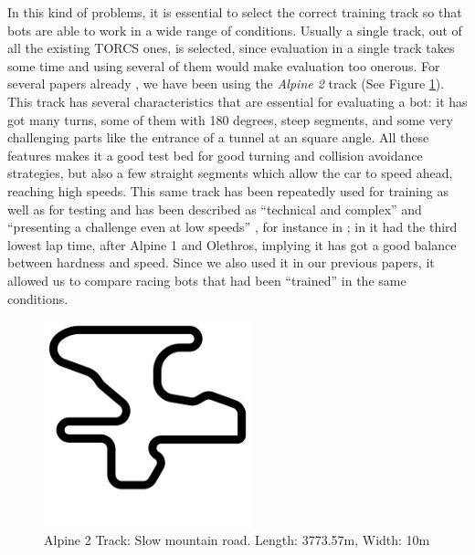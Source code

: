 \documentclass[10pt,journal,compsoc]{IEEEtran}
\begin{document}

In this kind of problems, it is essential to select the correct
training track so that bots are able to work in a wide range of
conditions. Usually a single track, out of all the existing TORCS
ones, is selected, since evaluation in a single track takes some time
and using several of them would make evaluation too onerous. For
several papers already \cite{salem_cig2018,DBLP:conf/cig/SalemMG19},
we have been using the \textit{Alpine 2} track (See Figure
\ref{fig:alpine2_track}). This track has several characteristics that
are essential for evaluating a bot: it has got many turns, some of
them with 180 degrees, steep segments, and some very challenging parts
like the entrance of a tunnel at an square angle. All these features makes
it a good test bed for good turning and collision avoidance
strategies, but also a few straight segments which allow the car to
speed ahead, reaching high speeds. This same track has been repeatedly
used for training as well as for testing and has been described as
``technical and complex'' \cite{AG} and ``presenting a challenge even
at low speeds'' \cite{vrajitoru2018global}, for instance in
\cite{cardamone2010applying,CarRacing_Pelta09,zong2017obstacle}; in \cite{AG} it had
the third lowest lap time, after Alpine 1 and Olethros, implying it
has got a good balance between hardness and speed. Since we also used
it in our previous papers, it allowed us to compare racing bots that
had been ``trained'' in the same conditions.

\begin{figure}[!ht]	
	\begin{center}
		\includegraphics[width=6cm]{fig/alpine2.jpg}
		\caption{Alpine 2 Track: Slow mountain road. Length: 3773.57m, Width: 10m}
		\label{fig:alpine2_track}	
	\end{center}	
\end{figure}
\end{document}
